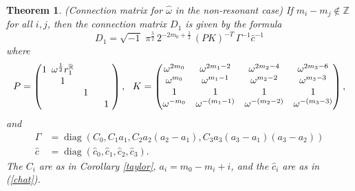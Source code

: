 \documentclass[a4paper,12pt,leqno]{amsart}
\numberwithin{equation}{section}
\theoremstyle{plain}
\newtheorem{theorem}{Theorem}[section]
\theoremstyle{definition}
\newcommand{\R}{\mathbb R}
\newcommand{\Z}{\mathbb Z}
\newcommand{\om}{\omega}
\newcommand{\Ga}{\Gamma}
\DeclareMathOperator{\diag}{diag}
\newcommand{\bp}{\begin{pmatrix}}
\newcommand{\ep}{\end{pmatrix}}
\newcommand{\ii}{ {\scriptstyle\sqrt{-1}}\, }
\newcommand{\nn}{m}
\newcommand{\Asharp}{\Ga}
\begin{document}
\begin{theorem}\label{connectionomegahat} {\em (Connection matrix for $\hat\om$ in the non-resonant case)}
\newline
If 
$\nn_i-\nn_j\notin\Z$ for all $i,j$,   
then the connection matrix $D_1$ is given by the formula
\[
D_1=
\ii \, \pi^{\frac52} \, 2^{-2\nn_0+\frac12}\,  (PK)^{-T}\, 
{\Asharp}^{-1} \hat c^{-1}
\]
where 
\[
P=
\bp
 1\!  & \!\! \om^{\frac12} r_1^\R \!\! & \hphantom{xx} & \hphantom{xx} \\
 & 1 & & \\
  & & 1 & \\
   & & & 1
\ep,
\ \ 
K=
\bp
\om^{2\nn_0} & \om^{2\nn_1-2} & \om^{2\nn_2-4} & \om^{2\nn_3-6} 
\\
\om^{\nn_0} & \om^{\nn_1-1} & \om^{\nn_2-2} & \om^{\nn_3-3}  
\\
1 & 1 & 1 & 1
\\
\om^{-\nn_0} & \om^{-(\nn_1-1)} & \om^{-(\nn_2-2)} & \om^{-(\nn_3-3)}  
\ep,
\]
and
\begin{align*}
\Asharp&=\diag(C_0,C_1 a_1,C_2 a_2 (a_2\!-\!a_1),C_3 a_3 (a_3\!-\!a_1) (a_3\!-\!a_2))
\\
\hat c&=\diag(\hat c_0,\hat c_1,\hat c_2,\hat c_3).
\end{align*}  
The $C_i$ are as in Corollary \ref{taylor}, $a_i=\nn_0-\nn_i+i$,
and the $\hat c_i$ are as in (\ref{chat}).
\end{theorem}
\end{document}
